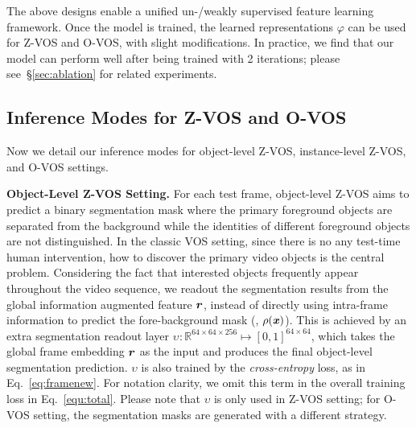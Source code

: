 \documentclass[10pt,twocolumn,letterpaper]{article}
\begin{document}
The above designs enable a unified un-/weakly supervised feature learning framework. Once the model is trained, the learned representations $\varphi$ can be used for Z-VOS and O-VOS, with slight modifications. In practice, we find that our model can perform well after being trained with 2 iterations; please see~\!\S\ref{sec:ablation} for related experiments.



\vspace{-2pt}
\subsection{Inference Modes for Z-VOS and O-VOS}
\label{sec:inference}
\vspace{-1pt}
Now we detail our inference modes for object-level Z-VOS, instance-level Z-VOS, and O-VOS settings.

\noindent\textbf{Object-Level Z-VOS Setting.} For each test frame, object-level Z-VOS aims to predict a binary segmentation mask where the primary foreground objects are separated from the background while the identities of different foreground objects are not distinguished. In the classic VOS setting, since there is no any test-time human intervention, how to discover the primary video objects is the central problem. Considering the fact that interested objects frequently appear throughout the video sequence, we readout the segmentation results from the global information augmented feature $\textbf{\textit{r}}$, instead of directly using intra-frame information to predict the fore-background mask (\ie, $\rho(\textbf{\textit{x}})$).
This is achieved by an extra segmentation readout layer $\upsilon_{\!}\!:\!\mathbb{R}^{64\!\times\!64\!\times\!256}\!\mapsto\![0,1]^{64\!\times\!64}$, which takes the global frame embedding $\textbf{\textit{r}}$ as the input and produces the final object-level segmentation prediction. $\upsilon$ is also trained by the \textit{cross-entropy} loss, as in Eq.~\!\ref{eq:framenew}. For notation clarity, we omit this term in the overall training loss in Eq.~\!\ref{equ:total}.  Please note that $\upsilon$ is only used in Z-VOS setting; for O-VOS setting, the segmentation masks are generated with a different strategy.
\end{document}
